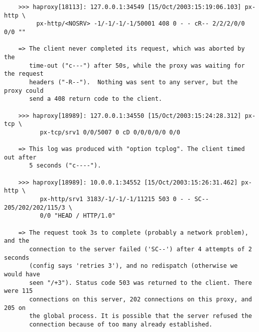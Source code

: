 \begin{verbatim}
    >>> haproxy[18113]: 127.0.0.1:34549 [15/Oct/2003:15:19:06.103] px-http \
         px-http/<NOSRV> -1/-1/-1/-1/50001 408 0 - - cR-- 2/2/2/0/0 0/0 ""

    => The client never completed its request, which was aborted by the
       time-out ("c---") after 50s, while the proxy was waiting for the request
       headers ("-R--").  Nothing was sent to any server, but the proxy could
       send a 408 return code to the client.

    >>> haproxy[18989]: 127.0.0.1:34550 [15/Oct/2003:15:24:28.312] px-tcp \
          px-tcp/srv1 0/0/5007 0 cD 0/0/0/0/0 0/0

    => This log was produced with "option tcplog". The client timed out after
       5 seconds ("c----").

    >>> haproxy[18989]: 10.0.0.1:34552 [15/Oct/2003:15:26:31.462] px-http \
          px-http/srv1 3183/-1/-1/-1/11215 503 0 - - SC-- 205/202/202/115/3 \
          0/0 "HEAD / HTTP/1.0"

    => The request took 3s to complete (probably a network problem), and the
       connection to the server failed ('SC--') after 4 attempts of 2 seconds
       (config says 'retries 3'), and no redispatch (otherwise we would have
       seen "/+3"). Status code 503 was returned to the client. There were 115
       connections on this server, 202 connections on this proxy, and 205 on
       the global process. It is possible that the server refused the
       connection because of too many already established.
       \end{verbatim}
